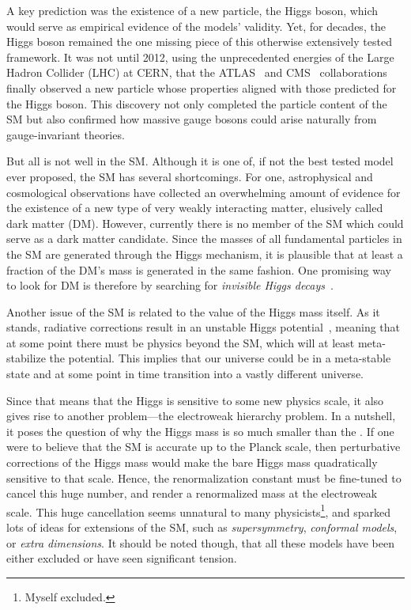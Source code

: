 A key prediction was the existence of a new particle, the Higgs boson, which would serve as empirical evidence of the models' validity. Yet, for decades, the Higgs boson remained the one missing piece of this otherwise extensively tested framework. It was not until 2012, using the unprecedented energies of the Large Hadron Collider (\acs{LHC}) at CERN, that the ATLAS~\cite{ATLAS:2012yve} and CMS~\cite{CMS:2012qbp} collaborations finally observed a new particle whose properties aligned with those predicted for the Higgs boson. This discovery not only completed the particle content of the \acs{SM} but also confirmed how massive gauge bosons could arise naturally from gauge-invariant theories.

But all is not well in the \acs{SM}. Although it is one of, if not the best tested model ever proposed, the \acs{SM} has several shortcomings. For one, astrophysical and cosmological observations have collected an overwhelming amount of evidence for the existence of a new type of very weakly interacting matter, elusively called dark matter (\acs{DM}). However, currently there is no member of the \acs{SM} which could serve as a dark matter candidate. Since the masses of all fundamental particles in the \acs{SM} are generated through the Higgs mechanism, it is plausible that at least a fraction of the \acs{DM}'s mass is generated in the same fashion. One promising way to look for \acs{DM} is therefore by searching for \textit{invisible Higgs decays}~\cite{ATLAS:2017nyv, CMS:2016dhk}.

Another issue of the \acs{SM} is related to the value of the Higgs mass itself. As it stands, radiative corrections result in an unstable Higgs potential~\cite{Degrassi:2012ry}, meaning that at some point there must be physics beyond the \acs{SM}, which will at least meta-stabilize the potential. This implies that our universe could be in a meta-stable state and at some point in time transition into a vastly different universe.

Since that means that the Higgs is sensitive to some new physics scale, it also gives rise to another problem---the electroweak hierarchy problem. In a nutshell, it poses the question of why the Higgs mass is so much smaller than the . If one were to believe that the \acs{SM} is accurate up to the Planck scale, then perturbative corrections of the Higgs mass would make the bare Higgs mass quadratically sensitive to that scale. Hence, the renormalization constant must be fine-tuned to cancel this huge number, and render a renormalized mass at the electroweak scale. This huge cancellation seems unnatural to many physicists\footnote{Myself excluded.}, and sparked lots of ideas for extensions of the \acs{SM}, such as \textit{supersymmetry}, \textit{conformal models}, or \textit{extra dimensions}. It should be noted though, that all these models have been either excluded or have seen significant tension.


